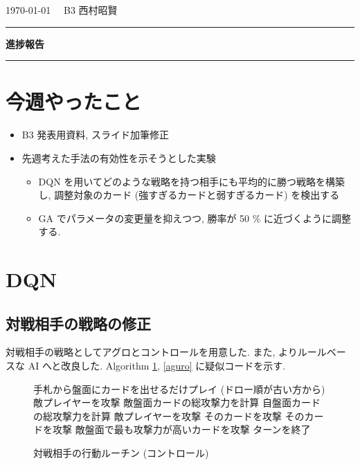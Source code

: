 \documentclass{jarticle}     %
\begin{document}
  \noindent
  \onecolumn
  \hspace{1em}

  \today
  \hfill
  \ \  B3 西村昭賢 

  \vspace{2mm}
  \hrule
  \begin{center}
  {\Large \bf 進捗報告}
  \end{center}
  \hrule
  \vspace{3mm}


\section{今週やったこと}
\begin{itemize}
  \item B3 発表用資料, スライド加筆修正
  \item 先週考えた手法の有効性を示そうとした実験
  \par
  \begin{itemize}
    \item DQN を用いてどのような戦略を持つ相手にも平均的に勝つ戦略を構築し, 調整対象のカード (強すぎるカードと弱すぎるカード) を検出する
    \item GA でパラメータの変更量を抑えつつ, 勝率が 50 \% に近づくように調整する.
  \end{itemize}
\end{itemize}


\section{DQN}
\subsection{対戦相手の戦略の修正}
対戦相手の戦略としてアグロとコントロールを用意した. また, よりルールベースな AI へと改良した. 
Algorithm \ref{controll}, \ref{aguro} に疑似コードを示す.
\begin{figure}[ht]
  \vspace{-0.3cm}
  \begin{algorithm}[H]
    \small
      \caption{
        対戦相手の行動ルーチン (コントロール)
        }
      \label{controll}
      \begin{algorithmic}[1] 
      \STATE 手札から盤面にカードを出せるだけプレイ (ドロー順が古い方から)
      \STATE 敵プレイヤーを攻撃
      \ELSE 
      \STATE 敵盤面カードの総攻撃力を計算
      \STATE 自盤面カードの総攻撃力を計算
      \STATE 敵プレイヤーを攻撃
      \ENDIF
      \STATE そのカードを攻撃
      \ELSE
      \STATE そのカードを攻撃
      \ELSE 
      \STATE 敵盤面で最も攻撃力が高いカードを攻撃
      \ENDIF
      \ENDIF
      \ENDIF
      \ENDFOR
      \STATE ターンを終了
      \end{algorithmic}
  \end{algorithm}
  \vspace{-0.3cm}
  \end{figure}
\end{document}
